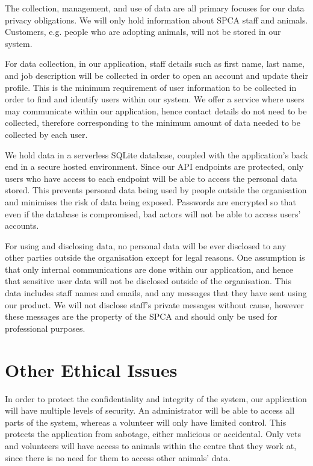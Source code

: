 The collection, management, and use of data are all primary focuses for our data privacy obligations. We will only hold information about SPCA staff and animals. Customers, e.g. people who are adopting animals, will not be stored in our system. 

For data collection, in our application, staff details such as first name, last name, and job description will be collected in order to open an account and update their profile. This is the minimum requirement of user information to be collected in order to find and identify users within our system. We offer a service where users may communicate within our application, hence contact details do not need to be collected, therefore corresponding to the minimum amount of data needed to be collected by each user.

We hold data in a serverless SQLite database, coupled with the application's back end in a secure hosted environment. Since our API endpoints are protected, only users who have access to each endpoint will be able to access the personal data stored. This prevents personal data being used by people outside the organisation and minimises the risk of data being exposed. Passwords are encrypted so that even if the database is compromised, bad actors will not be able to access users’ accounts.

For using and disclosing data, no personal data will be ever disclosed to any other parties outside the organisation except for legal reasons. One assumption is that only internal communications are done within our application, and hence that sensitive user data will not be disclosed outside of the organisation. This data includes staff names and emails, and any messages that they have sent using our product. We will not disclose staff’s private messages without cause, however these messages are the property of the SPCA and should only be used for professional purposes.

\section{Other Ethical Issues}

In order to protect the confidentiality and integrity of the system, our application will have multiple levels of security. An administrator will be able to access all parts of the system, whereas a volunteer will only have limited control. This protects the application from sabotage, either malicious or accidental. Only vets and volunteers will have access to animals within the centre that they work at, since there is no need for them to access other animals’ data. 

